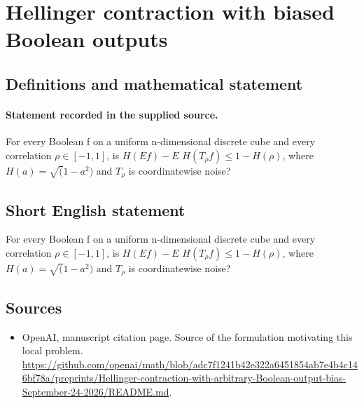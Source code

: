 \documentclass[11pt]{article}
\begin{document}
\section*{Hellinger contraction with biased Boolean outputs}\label{30007450}
\subsection{Definitions and mathematical statement}
\paragraph{Statement recorded in the supplied source.}
For every Boolean f on a uniform n-dimensional discrete cube and every correlation $\rho \in [-1,1]$, is $H(Ef)-E$ $H(T_\rho f)\leq 1-H(\rho )$, where $H(a)=\surd (1-a^{2})$ and $T_\rho $ is coordinatewise noise?
\subsection{Short English statement}
For every Boolean f on a uniform n-dimensional discrete cube and every correlation $\rho \in [-1,1]$, is $H(Ef)-E$ $H(T_\rho f)\leq 1-H(\rho )$, where $H(a)=\surd (1-a^{2})$ and $T_\rho $ is coordinatewise noise?
\subsection{Sources}
\begin{itemize}
\item[S1] OpenAI, manuscript citation page. Source of the formulation motivating this local problem.
\url{https://github.com/openai/math/blob/adc7f1241b42e322a6451854ab7e4b4c146bf78a/preprints/Hellinger-contraction-with-arbitrary-Boolean-output-bias-September-24-2026/README.md}.
\end{itemize}
\end{document}

